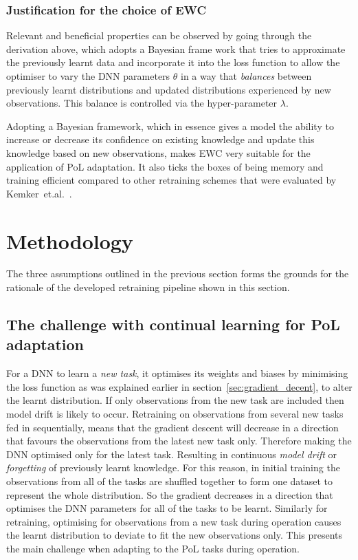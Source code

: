 \subsubsection{Justification for the choice of EWC}
Relevant and beneficial properties can be observed by going through the derivation above, which adopts a Bayesian frame work that  tries to approximate the previously learnt data and incorporate it into the loss function to allow the optimiser to vary the DNN parameters $\theta$ in a way that \textit{balances} between previously learnt distributions and updated distributions experienced by new observations. 
%
This balance is controlled via the hyper-parameter $\lambda$.

Adopting a Bayesian framework, which in essence gives a model the ability to increase or decrease its confidence on existing knowledge and update this knowledge based on new observations, makes EWC very suitable for the application of PoL adaptation.
%
It also ticks the boxes of being memory and training efficient compared to other retraining schemes that were evaluated by Kemker~et.al.~\cite{Kemker2018a}.


\section{Methodology}\label{sec:method}
The three assumptions outlined in the previous section forms the grounds for the rationale of the developed retraining pipeline shown in this section.
\subsection{The challenge with continual learning for PoL adaptation}
%
For a DNN to learn a \textit{new task}, it optimises its weights and biases by minimising the loss function as was explained earlier in section~\ref{sec:gradient_decent}, to alter the learnt distribution. If only observations from the new task are included then model drift is likely to occur. 
%
Retraining on observations from several new tasks fed in sequentially, means that the gradient descent will decrease in a direction that favours the observations from the latest new task only. Therefore making the DNN optimised only for the latest task. 
%
Resulting in continuous \textit{model drift} or \textit{forgetting} of previously learnt knowledge.
%
For this reason, in initial training the observations from all of the tasks are shuffled together to form one dataset to represent the whole distribution. 
%
So the gradient decreases in a direction that optimises the DNN parameters for all of the tasks to be learnt.
%
Similarly for retraining, optimising for observations from a new task during operation causes the learnt distribution to deviate to fit the new observations only. This presents the main challenge when adapting to the PoL tasks during operation. 

